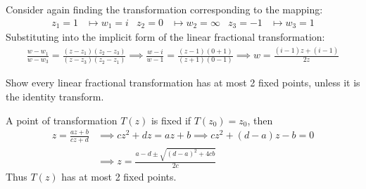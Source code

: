 \documentclass[12pt, english]{book}
\makeatletter
\renewenvironment{proof}[1][\proofname]{\par
	\pushQED{\qed}%
	\normalfont \topsep6\p@\@plus6\p@\relax
	\list{}{%
		\settowidth{\leftmargin}{\itshape\proofname:\hskip\labelsep}%
		\setlength{\labelwidth}{0pt}%
		\setlength{\itemindent}{-\leftmargin}%
		}%
	\item[\hskip\labelsep\itshape#1\@addpunct{:}]\ignorespaces
	}{\popQED\endlist\@endpefalse}
\makeatother
\begin{document}
	\begin{example}
		Consider again finding the transformation corresponding to the mapping:
		\begin{align*}
			z_1 = 1 &\mapsto w_1 = i &
			z_2 = 0 &\mapsto w_2 = \infty &
			z_3 = -1 &\mapsto w_3 = 1
		\end{align*}
		Substituting into the implicit form of the linear fractional transformation:
		\begin{align*}
			\frac{w - w_1}{w - w_3} = \frac{(z-z_1)(z_2 - z_3)}{(z - z_3)(z_2 - z_1)}
			\implies \frac{w - i}{w - 1} = \frac{(z - 1)(0 + 1)}{(z + 1)(0 - 1)}
			\implies w = \frac{(i-1)z + (i - 1)}{2z}
		\end{align*}
	\end{example}

	\begin{example}Show every linear fractional transformation has at most 2 fixed points, unless it is the identity transform.
		\label{Linear Fractional Transformation has at most 2 fixed points Example - Complex}
		
		\begin{proof}
		{\color{Grey}
		A point of transformation \(T(z)\) is fixed if \(T(z_0) = z_0\), then 
		\begin{align*}
			z = \frac{az + b}{cz + d} 
			&\implies cz^2 + dz = az + b \implies cz^2 + (d - a)z - b = 0 \\
			&\implies z = \frac{a - d \pm \sqrt{(d-a)^2 + 4cb}}{2c}
		\end{align*}
		Thus \(T(z)\) has at most 2 fixed points.}
		\end{proof}
	\end{example}
	
\end{document}

